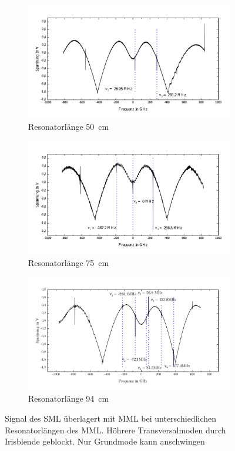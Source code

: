 \documentclass[a4paper,twoside,final]{article}
\begin{document}
\begin{figure}[htp]
  \centering
  \begin{subfigure}{0.8\textwidth}
    \includegraphics[width=\textwidth]{Bilder/mehrereResonatorlaengen_50cm_1Mode.pdf}
    \caption{Resonatorlänge \SI{50}{\centi\meter}}
  \end{subfigure}
  \begin{subfigure}{0.8\textwidth}
    \includegraphics[width=\textwidth]{Bilder/mehrereResonatorlaengen_75cm_1Mode.pdf}
    \caption{Resonatorlänge \SI{75}{\centi\meter}}
  \end{subfigure}
  \begin{subfigure}{0.8\textwidth}
    \includegraphics[width=\textwidth]{Bilder/1TransversaleMode_94cm.pdf}
    \caption{Resonatorlänge \SI{94}{\centi\meter}}
  \end{subfigure}
  \caption{Signal des SML überlagert mit MML bei unterschiedlichen Resonatorlängen des MML. Höhrere Transversalmoden durch Irisblende geblockt. Nur Grundmode kann anschwingen}
  \label{fig:Resonatorveränderung}
\end{figure}
\end{document}
